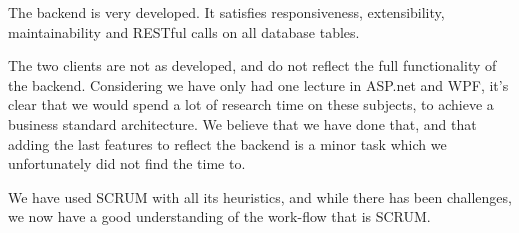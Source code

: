 The backend is very developed. It satisfies responsiveness, extensibility, maintainability and RESTful calls on all database tables.

The two clients are not as developed, and do not reflect the full functionality of the backend. Considering we have only had one lecture in ASP.net and WPF, it's clear that we would spend a lot of research time on these subjects, to achieve a business standard architecture. We believe that we have done that, and that adding the last features to reflect the backend is a minor task which we unfortunately did not find the time to.

We have used SCRUM with all its heuristics, and while there has been challenges, we now have a good understanding of the work-flow that is SCRUM.


